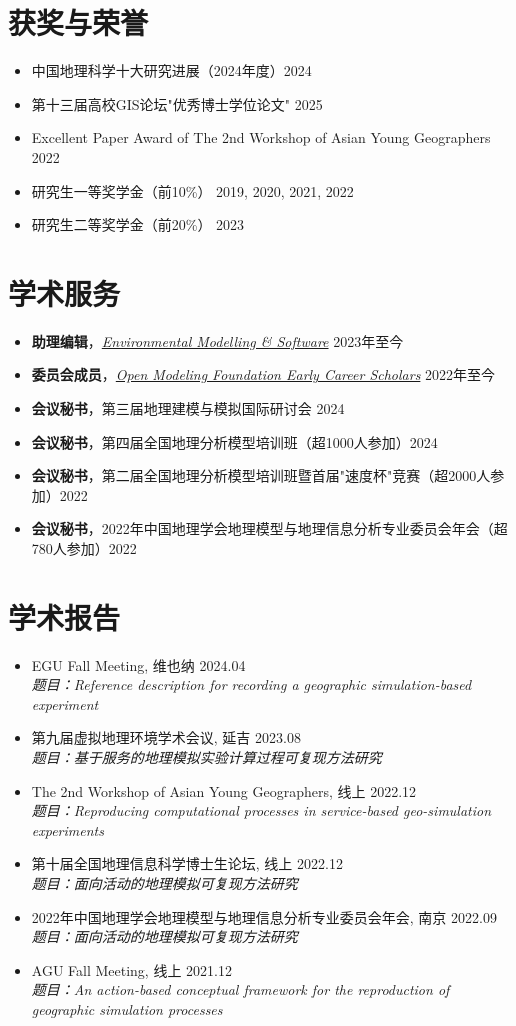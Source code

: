\documentclass[a4paper,11pt]{article}
\newcommand{\cvitem}[1]{
  \item {\small #1}
}
\begin{document}
\section{获奖与荣誉}
\begin{itemize}[leftmargin=0.15in,label={$\bullet$},itemsep=2pt]
  \cvitem{中国地理科学十大研究进展（2024年度）\hfill 2024}
  \cvitem{第十三届高校GIS论坛"优秀博士学位论文" \hfill 2025}
  \cvitem{Excellent Paper Award of The 2nd Workshop of Asian Young Geographers \hfill 2022}
  \cvitem{研究生一等奖学金（前10\%） \hfill 2019, 2020, 2021, 2022}
  \cvitem{研究生二等奖学金（前20\%） \hfill 2023}
\end{itemize}

\section{学术服务}
\begin{itemize}[leftmargin=0.15in,label={$\bullet$},itemsep=2pt]
  \cvitem{\textbf{助理编辑}，\href{https://www.sciencedirect.com/journal/environmental-modelling-and-software/}{\textit{Environmental Modelling \& Software}} \hfill 2023年至今}
  \cvitem{\textbf{委员会成员}，\href{https://www.openmodelingfoundation.org/governance/working-groups/}{\textit{Open Modeling Foundation Early Career Scholars}} \hfill 2022年至今}
  \cvitem{\textbf{会议秘书}，第三届地理建模与模拟国际研讨会 \hfill 2024}
  \cvitem{\textbf{会议秘书}，第四届全国地理分析模型培训班（超1000人参加）\hfill 2024}
  \cvitem{\textbf{会议秘书}，第二届全国地理分析模型培训班暨首届"速度杯"竞赛（超2000人参加）\hfill 2022}
  \cvitem{\textbf{会议秘书}，2022年中国地理学会地理模型与地理信息分析专业委员会年会（超780人参加）\hfill 2022}
\end{itemize}

\section{学术报告}
\begin{itemize}[leftmargin=0.15in,label={$\bullet$},itemsep=2pt]
  \cvitem{EGU Fall Meeting, 维也纳 \hfill 2024.04 \\
  \textit{题目：Reference description for recording a geographic simulation-based experiment}}
  \cvitem{第九届虚拟地理环境学术会议, 延吉 \hfill 2023.08 \\
  \textit{题目：基于服务的地理模拟实验计算过程可复现方法研究}}
  \cvitem{The 2nd Workshop of Asian Young Geographers, 线上 \hfill 2022.12 \\
  \textit{题目：Reproducing computational processes in service-based geo-simulation experiments}}
  \cvitem{第十届全国地理信息科学博士生论坛, 线上 \hfill 2022.12 \\
  \textit{题目：面向活动的地理模拟可复现方法研究}}
  \cvitem{2022年中国地理学会地理模型与地理信息分析专业委员会年会, 南京 \hfill 2022.09 \\
  \textit{题目：面向活动的地理模拟可复现方法研究}}
  \cvitem{AGU Fall Meeting, 线上 \hfill 2021.12 \\
  \textit{题目：An action-based conceptual framework for the reproduction of geographic simulation processes}}
\end{itemize}
\end{document}

